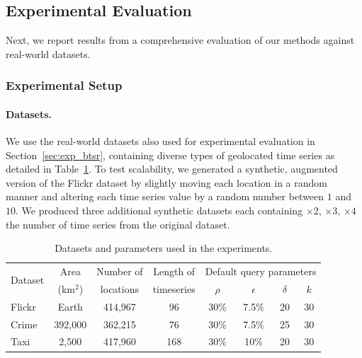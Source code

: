 
\subsection{Experimental Evaluation}
\label{subsec:local_sim_search_exp}

\graphicspath{{Papers/SSTD2019/}{Papers/SIGSpatial2019/}}

Next, we report results from a comprehensive evaluation of our methods against real-world datasets.

\subsubsection{Experimental Setup}
\label{subsec:evaluation_setup_search}

\paragraph {Datasets.} We use the real-world datasets also used for experimental evaluation in Section~\ref{sec:exp_btsr}, containing diverse types of geolocated time series as detailed in Table~\ref{tab:datasets}. To test scalability, we generated a synthetic, augmented version of the Flickr dataset by slightly moving each location in a random manner and altering each time series value by a random number between $1$ and $10$. We produced three additional synthetic datasets each containing $\times 2$, $\times 3$, $\times 4$ the number of time series from the original dataset. 

\begin{table}[t]
    \centering
    \caption{Datasets and parameters used in the experiments.}
    \begin{small}
    \centering
    \begin{tabular}{lccc|cccc}
    \hline
    \multirow{2}{*}{Dataset} & Area & Number of & Length of & \multicolumn{4}{c}{Default query parameters} \\
     & (km$^2$) & locations & timeseries & $\rho$ & $\epsilon$ & $\delta$ & $k$ \\
    \hline
    Flickr & Earth & 414,967 & 96 & 30\% & 7.5\% & 20 & 30\\
    Crime & 392,000 & 362,215 & 76 & 30\% & 7.5\% & 25 & 30 \\
    Taxi & 2,500 & 417,960 & 168 & 30\% & 10\% & 20 & 30 \\
    \hline
    \end{tabular}
    \end{small}
    \label{tab:datasets}
\end{table}

